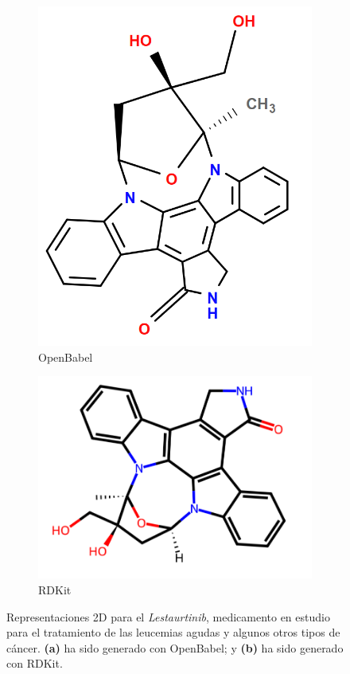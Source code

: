 \begin{figure}[h!]
\centering
\begin{subfigure}{.5\textwidth}
  \centering
  \includegraphics[width=.7\linewidth]{imagenes/estado_arte/Lestaurtinib_openbabel.png}
  \caption{OpenBabel}
\end{subfigure}%
\begin{subfigure}{.5\textwidth}
  \centering
  \includegraphics[width=.9\linewidth]{imagenes/estado_arte/Lestaurtinib_rdkit.png}
  \caption{RDKit}
\end{subfigure}
\caption{Representaciones 2D para el \emph{Lestaurtinib}, medicamento en estudio para el tratamiento de las leucemias agudas y algunos otros tipos de cáncer. \textbf{(a)} ha sido generado con OpenBabel; y \textbf{(b)} ha sido generado con RDKit.}
\label{fig:ejemplo_rdkit_vs_babel}
\end{figure}



